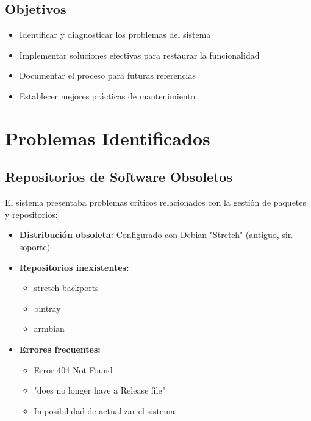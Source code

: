\documentclass[12pt, a4paper]{article}
\begin{document}
\subsection{Objetivos}
\begin{itemize}
    \item Identificar y diagnosticar los problemas del sistema
    \item Implementar soluciones efectivas para restaurar la funcionalidad
    \item Documentar el proceso para futuras referencias
    \item Establecer mejores prácticas de mantenimiento
\end{itemize}

\clearpage

\section{Problemas Identificados}
\label{sec:problemas}

\subsection{Repositorios de Software Obsoletos}
\label{subsec:repositorios_obsoletos}

El sistema presentaba problemas críticos relacionados con la gestión de paquetes y repositorios:

\begin{itemize}
    \item \textbf{Distribución obsoleta:} Configurado con Debian "Stretch" (antiguo, sin soporte)
    \item \textbf{Repositorios inexistentes:} 
    \begin{itemize}
        \item stretch-backports
        \item bintray
        \item armbian
    \end{itemize}
    \item \textbf{Errores frecuentes:}
    \begin{itemize}
        \item Error 404 Not Found
        \item "does no longer have a Release file"
        \item Imposibilidad de actualizar el sistema
    \end{itemize}
\end{itemize}
\end{document}
